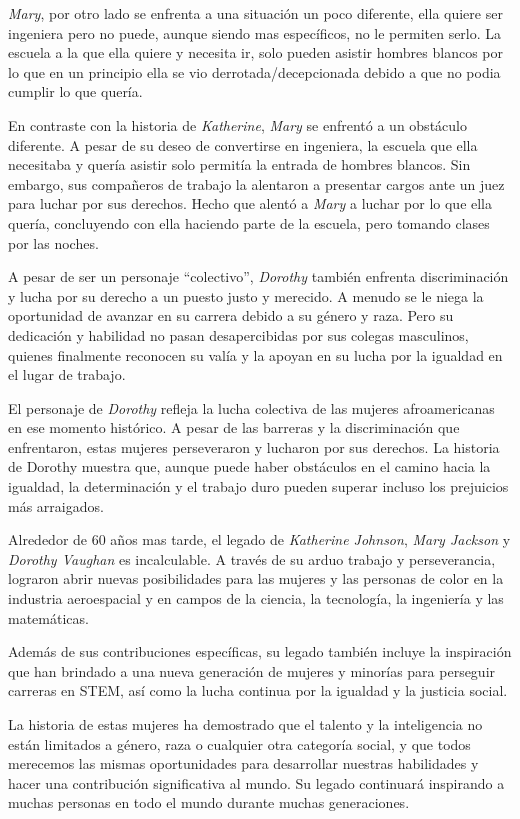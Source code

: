 \documentclass[letterpaper, 12pt]{report}
\begin{document}
\textit{Mary}, por otro lado se enfrenta a una situación un poco diferente,
ella quiere ser ingeniera pero no puede, aunque siendo mas específicos, no le
permiten serlo. La escuela a la que ella quiere y necesita ir, solo pueden
asistir hombres blancos por lo que en un principio ella se vio
derrotada/decepcionada debido a que no podia cumplir lo que quería.

En contraste con la historia de \textit{Katherine},
\textit{Mary} se enfrentó a un obstáculo diferente. A pesar
de su deseo de convertirse en ingeniera, la escuela que
ella necesitaba y quería asistir solo permitía la entrada
de hombres blancos. Sin embargo, sus compañeros de trabajo
la alentaron a presentar cargos ante un juez para luchar
por sus derechos. Hecho que alentó a \textit{Mary} a luchar
por lo que ella quería, concluyendo con ella haciendo parte
de la escuela, pero tomando clases por las noches.

A pesar de ser un personaje ``colectivo'', \textit{Dorothy}
también enfrenta discriminación y lucha por su derecho a un
puesto justo y merecido. A menudo se le niega la
oportunidad de avanzar en su carrera debido a su género y
raza. Pero su dedicación y habilidad no pasan
desapercibidas por sus colegas masculinos, quienes
finalmente reconocen su valía y la apoyan en su lucha por
la igualdad en el lugar de trabajo.

El personaje de \textit{Dorothy} refleja la lucha colectiva
de las mujeres afroamericanas en ese momento histórico. A
pesar de las barreras y la discriminación que enfrentaron,
estas mujeres perseveraron y lucharon por sus derechos. La
historia de Dorothy muestra que, aunque puede haber
obstáculos en el camino hacia la igualdad, la determinación
y el trabajo duro pueden superar incluso los prejuicios más
arraigados.

Alrededor de 60 años mas tarde, el legado de
\textit{Katherine Johnson}, \textit{Mary Jackson} y
\textit{Dorothy Vaughan} es incalculable. A través de su
arduo trabajo y perseverancia, lograron abrir nuevas
posibilidades para las mujeres y las personas de color en
la industria aeroespacial y en campos de la ciencia, la
tecnología, la ingeniería y las matemáticas.

Además de sus contribuciones específicas, su legado también
incluye la inspiración que han brindado a una nueva
generación de mujeres y minorías para perseguir carreras en
STEM, así como la lucha continua por la igualdad y la
justicia social.

La historia de estas mujeres ha demostrado que el talento y
la inteligencia no están limitados a género, raza o
cualquier otra categoría social, y que todos merecemos las
mismas oportunidades para desarrollar nuestras habilidades
y hacer una contribución significativa al mundo. Su legado
continuará inspirando a muchas personas en todo el mundo
durante muchas generaciones.

\newpage

\printbibliography
\end{document}
